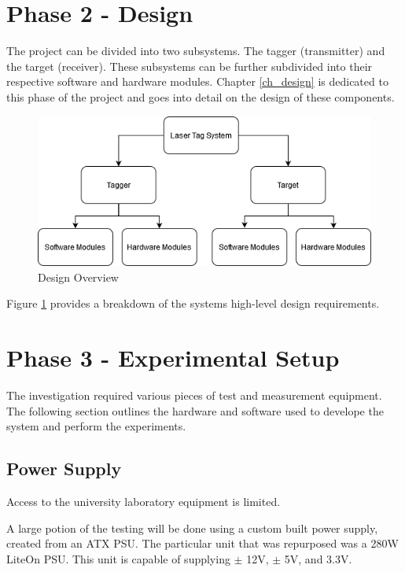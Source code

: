 
\section{Phase 2 - Design}

The project can be divided into two subsystems. The tagger (transmitter) and the target (receiver). These subsystems can be further subdivided into their respective software and hardware modules. Chapter \ref{ch_design} is dedicated to this phase of the project and goes into detail on the design of these components.

\begin{figure}[H]
	\centering
	\includegraphics[width=0.7\linewidth]{figures/methodology/design_overview}
	\caption{Design Overview}
	\label{fig:designoverview}
\end{figure}

Figure \ref{fig:designoverview} provides a breakdown of the systems high-level design requirements.



\section{Phase 3 - Experimental Setup}

The investigation required various pieces of test and measurement equipment. The following section outlines the hardware and software used to develope the system and perform the experiments.

\subsection{Power Supply}
Access to the university laboratory equipment is limited.

A large potion of the testing will be done using a custom built power supply, created from an ATX PSU. The particular unit that was repurposed was a 280W LiteOn PSU. This unit is capable of supplying $\pm$ 12V, $\pm$ 5V, and 3.3V.


